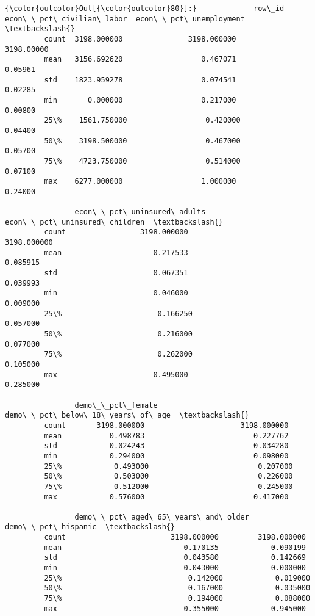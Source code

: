 \documentclass[11pt]{article}
\begin{document}
\begin{Verbatim}[commandchars=\\\{\}]
{\color{outcolor}Out[{\color{outcolor}80}]:}             row\_id  econ\_\_pct\_civilian\_labor  econ\_\_pct\_unemployment  \textbackslash{}
         count  3198.000000               3198.000000              3198.00000   
         mean   3156.692620                  0.467071                 0.05961   
         std    1823.959278                  0.074541                 0.02285   
         min       0.000000                  0.217000                 0.00800   
         25\%    1561.750000                  0.420000                 0.04400   
         50\%    3198.500000                  0.467000                 0.05700   
         75\%    4723.750000                  0.514000                 0.07100   
         max    6277.000000                  1.000000                 0.24000   
         
                econ\_\_pct\_uninsured\_adults  econ\_\_pct\_uninsured\_children  \textbackslash{}
         count                 3198.000000                   3198.000000   
         mean                     0.217533                      0.085915   
         std                      0.067351                      0.039993   
         min                      0.046000                      0.009000   
         25\%                      0.166250                      0.057000   
         50\%                      0.216000                      0.077000   
         75\%                      0.262000                      0.105000   
         max                      0.495000                      0.285000   
         
                demo\_\_pct\_female  demo\_\_pct\_below\_18\_years\_of\_age  \textbackslash{}
         count       3198.000000                      3198.000000   
         mean           0.498783                         0.227762   
         std            0.024243                         0.034280   
         min            0.294000                         0.098000   
         25\%            0.493000                         0.207000   
         50\%            0.503000                         0.226000   
         75\%            0.512000                         0.245000   
         max            0.576000                         0.417000   
         
                demo\_\_pct\_aged\_65\_years\_and\_older  demo\_\_pct\_hispanic  \textbackslash{}
         count                        3198.000000         3198.000000   
         mean                            0.170135            0.090199   
         std                             0.043580            0.142669   
         min                             0.043000            0.000000   
         25\%                             0.142000            0.019000   
         50\%                             0.167000            0.035000   
         75\%                             0.194000            0.088000   
         max                             0.355000            0.945000   
         

\end{Verbatim}
\end{document}
